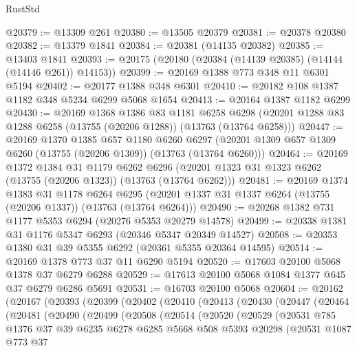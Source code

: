 \begin{lexlean}{RustStd}
\begin{coremodule}
@20379 := @13309 @261
@20380 := @13505 @20379
@20381 := @20378 @20380
@20382 := @13379 @1841
@20384 := @20381 (@14135 @20382)
@20385 := @13403 @1841
@20393 := @20175 (@20180 (@20384 (@14139 @20385) (@14144 (@14146 @261)) @14153))
@20399 := @20169 @1388 @773 @348 @11 @6301 @5194
@20402 := @20177 @1388 @348 @6301
@20410 := @20182 @108 @1387 @1182 @348 @5234 @6299 @5068 @1654
@20413 := @20164 @1387 @1182 @6299
@20430 := @20169
    @1368
    @1386
    @83
    @1181
    @6258
    @6298
    (@20201 @1288 @83 @1288 @6258 (@13755 (@20206 @1288)) (@13763 (@13764 @6258)))
@20447 := @20169
    @1370
    @1385
    @657
    @1180
    @6260
    @6297
    (@20201 @1309 @657 @1309 @6260 (@13755 (@20206 @1309)) (@13763 (@13764 @6260)))
@20464 := @20169
    @1372
    @1384
    @31
    @1179
    @6262
    @6296
    (@20201 @1323 @31 @1323 @6262 (@13755 (@20206 @1323)) (@13763 (@13764 @6262)))
@20481 := @20169
    @1374
    @1383
    @31
    @1178
    @6264
    @6295
    (@20201 @1337 @31 @1337 @6264 (@13755 (@20206 @1337)) (@13763 (@13764 @6264)))
@20490 := @20268 @1382 @731 @1177 @5353 @6294 (@20276 @5353 @20279 @14578)
@20499 := @20338 @1381 @31 @1176 @5347 @6293 (@20346 @5347 @20349 @14527)
@20508 := @20353 @1380 @31 @39 @5355 @6292 (@20361 @5355 @20364 @14595)
@20514 := @20169 @1378 @773 @37 @11 @6290 @5194
@20520 := @17603 @20100 @5068 @1378 @37 @6279 @6288
@20529 := @17613 @20100 @5068 @1084 @1377 @645 @37 @6279 @6286 @5691
@20531 := @16703 @20100 @5068
@20604 := @20162
    (@20167
      (@20393
        (@20399
          (@20402
            (@20410
              (@20413
                (@20430
                  (@20447
                    (@20464
                      (@20481
                        (@20490
                          (@20499
                            (@20508
                              (@20514
                                (@20520
                                  (@20529
                                    (@20531
                                      @785
                                      @1376
                                      @37
                                      @39
                                      @6235
                                      @6278
                                      @6285
                                      @5668
                                      @508
                                      @5393
                                      @20298
                                      (@20531
                                        @1087
                                        @773
                                        @37

\end{coremodule}
\end{lexlean}
